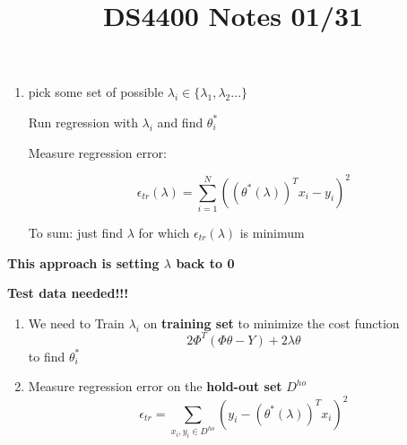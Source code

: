 \documentclass[12pt]{article}
\begin{document}
\begin{enumerate}
            \begin{enumerate}
                \item pick some set of possible $\lambda_i \in \{\lambda_1, \lambda_2 \dots\}$
                
                Run regression with $\lambda_i$ and find $\theta^*_i$

                Measure regression error:

                $$\epsilon_{tr}(\lambda) = \sum_{i=1}^N ((\theta^*(\lambda))^T x_i - y_i)^2$$

                To sum: just find $\lambda$ for which $\epsilon_{tr}(\lambda)$ is minimum
            \end{enumerate}

            \textbf{This approach is setting $\lambda$ back to 0}

            \textbf{Test data needed!!!}

            \begin{enumerate}
                \item We need to Train $\lambda_i$ on \textbf{training set} to minimize the cost function $$2\Phi^T(\Phi \theta - Y) + 2\lambda \theta$$ to find $\theta^*_i$
                \item Measure regression error on the \textbf{hold-out set} $D^{ho}$
                $$\epsilon_{tr} = \sum_{x_i,y_i \in D^{ho} } (y_i - (\theta^*(\lambda))^Tx_i)^2$$

            \end{enumerate}
        \end{enumerate}
        \title{DS4400 Notes 01/31}
        \maketitle
\end{document}
